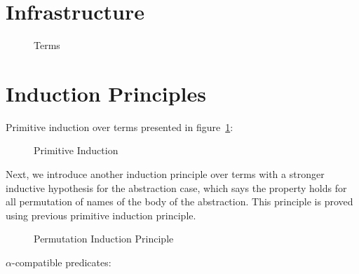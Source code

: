 \documentclass{article}
\begin{document}
\section{Infrastructure}
\label{sec:infra}

\begin{figure}[!ht]
   \hspace{5px}
  \caption{Terms}
\label{fig:term}
\end{figure}


 \hspace{5px}


 \hspace{5px}

 \hspace{5px}

 \hspace{5px}

 \hspace{5px}


\newpage
\section{Induction Principles}
\label{sec:induction}

Primitive induction over terms presented in figure~\ref{fig:term}:

\begin{figure}[!ht]
  \caption{Primitive Induction}
\label{fig:primInd}
\end{figure}

Next, we introduce another induction principle over terms with a stronger inductive hypothesis for the abstraction case, which says the property holds for all permutation of names of the body of the abstraction. This principle is proved using previous primitive induction principle.

\begin{figure}[!ht]
  \caption{Permutation Induction Principle}
\label{fig:permInd}
\end{figure}

$\alpha$-compatible predicates:
\end{document}
